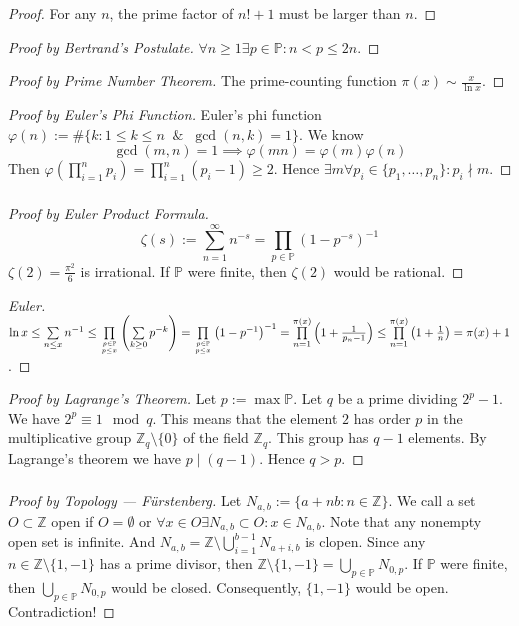 \documentclass[UTF8,aspectratio=43,11pt,colorlinks,compress,openany]{beamer}%
\begin{document}
\begin{frame}\frametitle{}
\begin{proof}
For any $n$, the prime factor of $n!+1$ must be larger than $n$.
\end{proof}
\begin{proof}[Proof by Bertrand's Postulate]
$\forall n\geq 1\exists p\in\mathbb{P}: n<p\leq 2n$.
\end{proof}
\begin{proof}[Proof by Prime Number Theorem]
The prime-counting function $\pi(x)\sim\frac{x}{\ln x}$.
\end{proof}
\begin{proof}[Proof by Euler's Phi Function]
Euler's phi function $\varphi(n):=\#\{k: 1\leq k\leq n\;\;\&\;\;\gcd(n,k)=1\}$. We know
\[\gcd(m,n)=1\implies\varphi(mn)=\varphi(m)\varphi(n)\]
Then $\varphi\left(\prod\limits_{i=1}^n p_i\right)=\prod\limits_{i=1}^n(p_i-1)\geq 2$. Hence $\exists m\forall p_i\in\{p_1,\dots,p_n\}: p_i\nmid m$.
\end{proof}
\end{frame}

\begin{frame}\frametitle{}
\begin{proof}[Proof by Euler Product Formula]
\[\zeta(s):=\sum\limits_{n=1}^\infty n^{-s}=\prod\limits_{p\in\mathbb{P}}\left(1-p^{-s}\right)^{-1}\]
$\zeta(2)=\frac{\pi^2}{6}$ is irrational. If $\mathbb{P}$ were finite, then $\zeta(2)$ would be rational.
\end{proof}
\begin{proof}[Euler]
$\ln x\leq\sum\limits_{n\leq x} n^{-1}\leq \prod\limits_{p\in\mathbb{P}\atop{p\leq x}}\left(\sum\limits_{k\geq 0}p^{-k}\right)=\prod\limits_{p\in\mathbb{P}\atop{p\leq x}}\left(1-p^{-1}\right)^{-1}=\prod\limits_{n=1}^{\pi(x)}\left(1+\frac{1}{p_n-1}\right)\leq \prod\limits_{n=1}^{\pi(x)}\left(1+\frac{1}{n}\right)=\pi(x)+1$.
\end{proof}
\begin{proof}[Proof by Lagrange's Theorem]
Let $p:=\max\mathbb{P}$. Let $q$ be a prime dividing $2^p-1$. We have $2^p\equiv 1 \mod q$. This means that the element $2$ has order $p$ in the multiplicative group $\mathbb{Z}_q\setminus\{0\}$ of the field $\mathbb{Z}_q$. This group has $q-1$ elements. By Lagrange's theorem we have $p\mid(q-1)$. Hence $q>p$.
\end{proof}
\end{frame}

\begin{frame}\frametitle{}
\begin{proof}[Proof by Topology --- F\"urstenberg]
Let $N_{a,b}:=\{a+nb: n\in\mathbb{Z}\}$. We call a set $O\subset\mathbb{Z}$ open if $O=\emptyset$ or $\forall x\in O\exists N_{a,b}\subset O: x \in N_{a,b}$. Note that any nonempty open set is infinite. And $N_{a,b}=\mathbb{Z}\setminus\bigcup_{i=1}^{b-1}N_{a+i,b}$ is clopen. Since any $n\in\mathbb{Z}\setminus\{1,-1\}$ has a prime divisor, then $\mathbb{Z}\setminus\{1,-1\}=\bigcup_{p \in\mathbb{P}}N_{0,p}$. If $\mathbb{P}$ were finite, then $\bigcup_{p \in\mathbb{P}}N_{0,p}$ would be closed. Consequently, $\{1,-1\}$ would be open. Contradiction!
\end{proof}
\end{frame}
\end{document}
